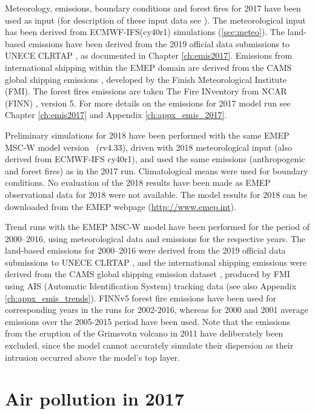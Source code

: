  Meteorology, emissions, boundary conditions and forest fires for 2017
 have been used as input (for description of these input data see
 \citealt{Simpson_et_al:EMEP}). The meteorological input has been
 derived from ECMWF-IFS(cy40r1) simulations (\ref{sec:meteo}). The
 land-based emissions have been derived from the 2019 official data
 submissions to UNECE CLRTAP \citep{CEIP2019}, as documented in
 Chapter \ref{ch:emis2017}. Emissions from international shipping
 within the EMEP domain are derived from the CAMS global shipping
 emissions \citep{CAMSemis2019}, developed by the Finish
 Meteorological Institute (FMI). The forest fires emissions are taken
 The Fire INventory from NCAR (FINN) \citep{FINNIGAN1990}, version 5.
 For more details on the emissions for 2017 model run see Chapter
 \ref{ch:emis2017} and Appendix \ref{ch:appx_emis_2017}.

 Preliminary simulations for 2018 have been performed with the same
 EMEP MSC-W model version ~(rv4.33), driven with 2018 meteorological
 input (also derived from ECMWF-IFS cy40r1), and used the same emissions
 (anthropogenic and forest fires) as in the 2017 run. Climatological
 means were used for boundary conditions. No evaluation of the 2018
 results have been made as EMEP observational data for 2018 were not
 available. The model results for 2018 can be downloaded from the EMEP
 webpage (\url{http://www.emep.int}).

 Trend runs with the EMEP MSC-W model have been performed for the
 period of 2000--2016, using meteorological data and emissions for the
 respective years. The land-based emissions for 2000--2016 were
 derived from the 2019 official data submissions to UNECE CLRTAP
 \citep{CEIP2019}, and the international shipping emissions were
 derived from the CAMS global shipping emission dataset
 \citep{CAMSemis2019,ECCAD}, produced by FMI using AIS (Automatic
 Identification System) tracking data (see also Appendix
 \ref{ch:appx_emis_trends}). FINNv5 forest fire emissions have been
 used for corresponding years in the runs for 2002-2016, whereas for
 2000 and 2001 average emissions over the 2005-2015 period have been
 used. Note that the \sox emissions from the eruption of the Grimsvotn
 volcano in 2011 have deliberately been excluded, since the model
 cannot accurately simulate their dispersion as their intrusion
 occurred above the model's top layer.



\section{Air pollution in 2017} %

